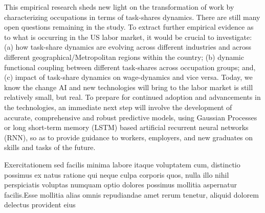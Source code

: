 \documentclass[letterpaper]{article} %
\begin{document}
\par  This empirical research sheds new light on the transformation of work by characterizing occupations in terms of task-shares dynamics. There are still many open questions remaining in the study. To extract further empirical evidence as to what is occurring in the US labor market, it would be crucial to investigate: (a) how task-share dynamics are evolving across different industries and across different geographical/Metropolitan regions within the country; (b) dynamic functional coupling between different task-shares across occupation groups; and, (c) impact of task-share dynamics on wage-dynamics and vice versa. Today, we know the change AI and new technologies will bring to the labor market is still relatively small, but real. To prepare for continued adoption and advancements in the technologies, an immediate next step will involve the development of accurate, comprehensive and robust predictive models, using Gaussian Processes or long short-term memory (LSTM) based artificial recurrent neural networks (RNN), so as to provide guidance to workers, employers, and new graduates on skills and tasks of the future.



Exercitationem sed facilis minima labore itaque voluptatem cum, distinctio possimus ex natus ratione qui neque culpa corporis quos, nulla illo nihil perspiciatis voluptas numquam optio dolores possimus mollitia aspernatur facilis.Esse mollitia alias omnis repudiandae amet rerum tenetur, aliquid dolorem delectus provident eius

\end{document}
